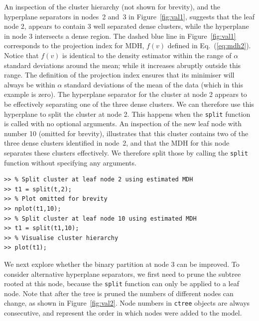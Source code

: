 \documentclass{book}
\begin{document}
\noindent
%
An inspection of the cluster hierarchy (not shown for brevity), and the
hyperplane separators in nodes~2 and~3 in Figure~\ref{fig:val1}, suggests that
the leaf node 2, appears to contain 3 well separated dense clusters, while the
hyperplane in node 3 intersects a dense region.
%
The dashed blue line in Figure~\ref{fig:val1} corresponds to the projection
index for MDH, $f(v)$ defined in Eq.~(\ref{eq:mdh2}).
%
Notice that $f(v)$ is identical to the density estimator within the range
of $\alpha$ standard deviations around the mean; while 
it increases abruptly outside this range. 
%
The definition of the projection index ensures that its minimiser will always
be within $\alpha$ standard deviations of the mean of the data (which in this example is zero).
%
The hyperplane separator for the cluster at node 2 appears to be effectively
separating one of the three dense clusters.  We can therefore use this
hyperplane to split the cluster at node 2. 
%
This happens when the {\tt split} function is called with no optional
arguments. 
%
An inspection of the new leaf node with number 10 (omitted for brevity),
illustrates that this cluster contains two of the three dense clusters
identified in node~2, and that the MDH for this node separates these
clusters effectively.
%
We therefore split those by calling the {\tt  split} function without
specifying any arguments.


\begin{verbatim}
>> % Split cluster at leaf node 2 using estimated MDH
>> t1 = split(t,2);
>> % Plot omitted for brevity
>> nplot(t1,10);
>> % Split cluster at leaf node 10 using estimated MDH
>> t1 = split(t1,10);
>> % Visualise cluster hierarchy
>> plot(t1);
\end{verbatim}

\noindent
%
We next explore whether the binary partition at node 3 can be improved.
%
To consider alternative hyperplane separators, we first need to
prune the subtree rooted at this node, because the {\tt split} function can
only be applied to a leaf node. Note that after the tree is pruned
the numbers of different nodes can change,
as shown in Figure~\ref{fig:val2}. Node numbers in {\tt ctree} objects
are always consecutive, and represent the order in which nodes were added to the model.
\end{document}
